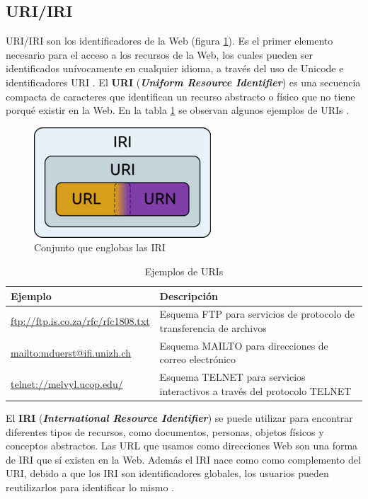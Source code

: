 \subsection{URI/IRI}

URI/IRI son los identificadores de la Web (figura \ref{fig:250px-irivenndiagramm}). Es el primer elemento necesario para el acceso a los recursos de la Web, los cuales pueden ser identificados unívocamente en cualquier idioma, a través del uso de Unicode e identificadores URI \cite{aplicacion}. El \textbf{URI} (\textit{\textbf{Uniform Resource Identifier}}) es una secuencia compacta de caracteres que identifican un recurso abstracto o físico que no tiene porqué existir en la Web. En la tabla \ref{uris} se observan algunos ejemplos de URIs \cite{uri}.

\begin{figure}[H]
	\centering
	\includegraphics[width=0.4\linewidth]{imagenes/capitulo3/URI}
	\caption{Conjunto que englobas las IRI}
	\label{fig:250px-irivenndiagramm}
\end{figure}


\begin{table}[H]
	\caption{Ejemplos de URIs}
	\label{uris}
	\centering
	\begin{tabular}{|m{5.6cm}|m{5.6cm}|}
		\rowcolor[HTML]{EFEFEF} 
		\hline
		Ejemplo & Descripción \\ \hline
		\url{ftp://ftp.is.co.za/rfc/rfc1808.txt} & Esquema FTP para servicios de protocolo de transferencia de archivos\\ \hline
		\url{mailto:mduerst@ifi.unizh.ch} & Esquema MAILTO para direcciones de correo electrónico \\ \hline
		\url{telnet://melvyl.ucop.edu/} & Esquema TELNET para servicios interactivos a través del protocolo TELNET\\ \hline
	\end{tabular}
\end{table}

El \textbf{IRI} (\textit{\textbf{International Resource Identifier}}) se puede utilizar para encontrar diferentes tipos de recursos, como documentos, personas, objetos físicos y conceptos abstractos. Las URL que usamos como direcciones Web son una forma de IRI que sí existen en la Web. Además el IRI nace como como complemento del URI, debido a que los IRI son identificadores globales, los usuarios pueden reutilizarlos para identificar lo mismo \cite{libro-gis}.


